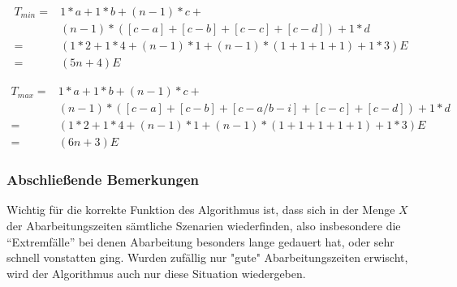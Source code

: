 \documentclass{article}
\begin{document}
    \begin{align*}
        T_{min} = &1*a + 1*b +(n-1)*c + \\ &(n-1)*([c-a] + [c-b] + [c-c] + [c-d]) + 1 * d\\
        = &(1*2 + 1*4 + (n-1)*1 + (n-1)*(1 + 1 + 1 + 1) + 1*3)E\\
        = &(5n+4)E
    \end{align*}
    

    \begin{align*}
        T_{max} = &1*a + 1*b +(n-1)*c + \\ &(n-1)*([c-a] + [c-b] + [c-a/b-i] + [c-c] + [c-d]) + 1 * d\\
        = &(1*2 + 1*4 + (n-1)*1 + (n-1)*(1 + 1 + 1 + 1 + 1) + 1*3)E\\
        = &(6n+3)E
    \end{align*}


    \subsubsection*{Abschließende Bemerkungen}
    Wichtig für die korrekte Funktion des Algorithmus ist, dass sich in der Menge $X$ der Abarbeitungszeiten sämtliche Szenarien wiederfinden, 
    also insbesondere die "`Extremfälle"' bei denen Abarbeitung besonders lange gedauert hat, oder sehr schnell vonstatten ging. Wurden zufällig nur "gute" Abarbeitungszeiten erwischt, wird der Algorithmus auch nur diese
    Situation wiedergeben. 
\end{document}
